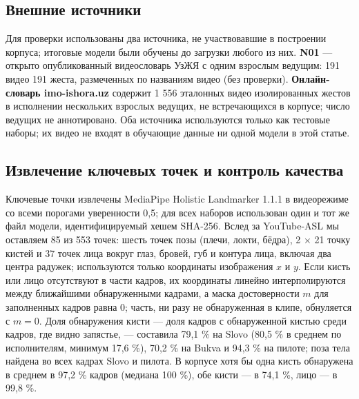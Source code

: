 \hypertarget{ux432ux43dux435ux448ux43dux438ux435-ux438ux441ux442ux43eux447ux43dux438ux43aux438}{%
\subsection{Внешние источники}\label{ux432ux43dux435ux448ux43dux438ux435-ux438ux441ux442ux43eux447ux43dux438ux43aux438}}

Для проверки использованы два источника, не участвовавшие в построении корпуса; итоговые модели были обучены до загрузки любого из них. \textbf{N01} --- открыто опубликованный видеословарь УзЖЯ с одним взрослым ведущим: 191 видео 191 жеста, размеченных по названиям видео (без проверки). \textbf{Онлайн-словарь imo-ishora.uz} содержит 1 556 эталонных видео изолированных жестов в исполнении нескольких взрослых ведущих, не встречающихся в корпусе; число ведущих не аннотировано. Оба источника используются только как тестовые наборы; их видео не входят в обучающие данные ни одной модели в этой статье.

\hypertarget{ux438ux437ux432ux43bux435ux447ux435ux43dux438ux435-ux43aux43bux44eux447ux435ux432ux44bux445-ux442ux43eux447ux435ux43a-ux438-ux43aux43eux43dux442ux440ux43eux43bux44c-ux43aux430ux447ux435ux441ux442ux432ux430}{%
\subsection{Извлечение ключевых точек и контроль качества}\label{ux438ux437ux432ux43bux435ux447ux435ux43dux438ux435-ux43aux43bux44eux447ux435ux432ux44bux445-ux442ux43eux447ux435ux43a-ux438-ux43aux43eux43dux442ux440ux43eux43bux44c-ux43aux430ux447ux435ux441ux442ux432ux430}}

Ключевые точки извлечены MediaPipe Holistic Landmarker 1.1.1 \citep{docs_mediapipe_holistic_landmarker} в видеорежиме со всеми порогами уверенности 0,5; для всех наборов использован один и тот же файл модели, идентифицируемый хешем SHA-256. Вслед за YouTube-ASL \citep{2023_uthus_youtube_asl} мы оставляем 85 из 553 точек: шесть точек позы (плечи, локти, бёдра), 2 × 21 точку кистей и 37 точек лица вокруг глаз, бровей, губ и контура лица, включая два центра радужек; используются только координаты изображения \(x\) и \(y\). Если кисть или лицо отсутствуют в части кадров, их координаты линейно интерполируются между ближайшими обнаруженными кадрами, а маска достоверности \(m\) для заполненных кадров равна 0; часть, ни разу не обнаруженная в клипе, обнуляется с \(m = 0\). Доля обнаружения кисти --- доля кадров с обнаруженной кистью среди кадров, где видно запястье, --- составила 79,1 \% на Slovo (80,5 \% в среднем по исполнителям, минимум 17,6 \%), 70,2 \% на Bukva и 94,3 \% на пилоте; поза тела найдена во всех кадрах Slovo и пилота. В корпусе хотя бы одна кисть обнаружена в среднем в 97,2 \% кадров (медиана 100 \%), обе кисти --- в 74,1 \%, лицо --- в 99,8 \%.


